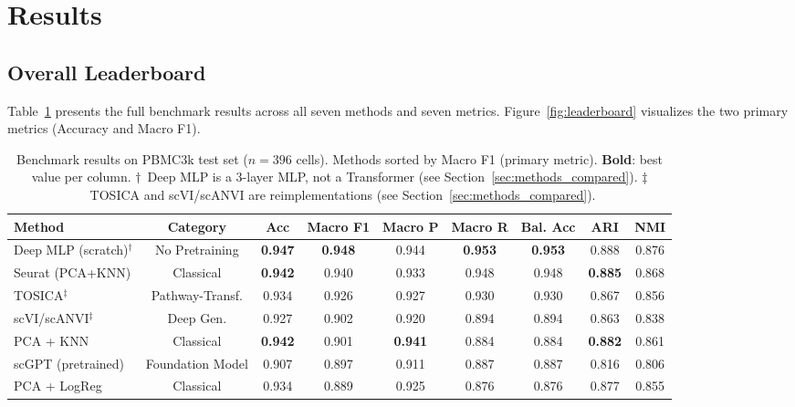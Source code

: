 \documentclass{article}
\begin{document}
\section{Results}
\label{sec:results}

\subsection{Overall Leaderboard}
\label{sec:leaderboard}

Table~\ref{tab:leaderboard} presents the full benchmark results across all seven methods
and seven metrics. Figure~\ref{fig:leaderboard} visualizes the two primary metrics
(Accuracy and Macro F1).

\begin{table}[h]
\centering
\caption{Benchmark results on PBMC3k test set ($n=396$ cells). Methods sorted by Macro F1
(primary metric). \textbf{Bold}: best value per column.
$\dagger$~Deep MLP is a 3-layer MLP, not a Transformer (see Section~\ref{sec:methods_compared}).
$\ddagger$~TOSICA and scVI/scANVI are reimplementations (see Section~\ref{sec:methods_compared}).}
\label{tab:leaderboard}
\setlength{\tabcolsep}{5pt}
\renewcommand{\arraystretch}{1.15}
\small
\begin{tabular}{lcccccccc}
\toprule
\textbf{Method} & \textbf{Category} & \textbf{Acc} & \textbf{Macro F1} & \textbf{Macro P} & \textbf{Macro R} & \textbf{Bal. Acc} & \textbf{ARI} & \textbf{NMI} \\
\midrule
\rowcolor{lightgray}
Deep MLP (scratch)$^\dagger$ & No Pretraining & \textbf{0.947} & \textbf{0.948} & 0.944 & \textbf{0.953} & \textbf{0.953} & 0.888 & 0.876 \\
Seurat (PCA+KNN)  & Classical       & \textbf{0.942} & 0.940 & 0.933 & 0.948 & 0.948 & \textbf{0.885} & 0.868 \\
TOSICA$^\ddagger$ & Pathway-Transf. & 0.934 & 0.926 & 0.927 & 0.930 & 0.930 & 0.867 & 0.856 \\
scVI/scANVI$^\ddagger$ & Deep Gen.  & 0.927 & 0.902 & 0.920 & 0.894 & 0.894 & 0.863 & 0.838 \\
PCA + KNN         & Classical       & \textbf{0.942} & 0.901 & \textbf{0.941} & 0.884 & 0.884 & \textbf{0.882} & 0.861 \\
\rowcolor{highlightrow}
scGPT (pretrained)& Foundation Model& 0.907 & 0.897 & 0.911 & 0.887 & 0.887 & 0.816 & 0.806 \\
PCA + LogReg      & Classical       & 0.934 & 0.889 & 0.925 & 0.876 & 0.876 & 0.877 & 0.855 \\
\bottomrule
\end{tabular}
\end{table}
\end{document}
